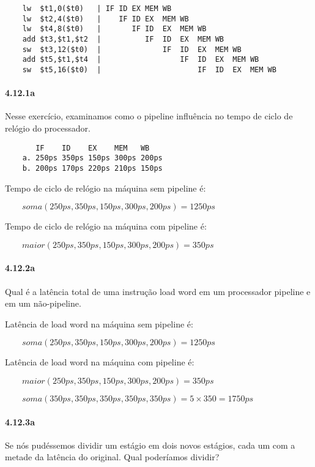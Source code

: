 \documentclass{article}
\begin{document}
\begin{enumerate}
  \begin{verbatim}
    lw  $t1,0($t0)   | IF ID EX MEM WB
    lw  $t2,4($t0)   |    IF ID EX  MEM WB
    lw  $t4,8($t0)   |       IF ID  EX  MEM WB
    add $t3,$t1,$t2  |          IF  ID  EX  MEM WB
    sw  $t3,12($t0)  |              IF  ID  EX  MEM WB
    add $t5,$t1,$t4  |                  IF  ID  EX  MEM WB
    sw  $t5,16($t0)  |                      IF  ID  EX  MEM WB
  \end{verbatim}

\end{enumerate}

\clearpage

\paragraph{4.12.1a} Nesse exercício, examinamos como o pipeline influência no 
tempo de ciclo de relógio do processador.

  \begin{verbatim}
       IF    ID    EX    MEM   WB
    a. 250ps 350ps 150ps 300ps 200ps
    b. 200ps 170ps 220ps 210ps 150ps
  \end{verbatim}

Tempo de ciclo de relógio na máquina sem pipeline é:

$\qquad soma(250ps,350ps,150ps,300ps,200ps) = 1250ps$

Tempo de ciclo de relógio na máquina com pipeline é:

$\qquad maior(250ps, 350ps, 150ps, 300ps, 200ps) = 350ps$

\paragraph{4.12.2a} Qual é a latência total de uma instrução load word em um 
processador pipeline e em um não-pipeline.

Latência de load word na máquina sem pipeline é:

$\qquad soma(250ps,350ps,150ps,300ps,200ps) = 1250ps$

Latência de load word na máquina com pipeline é:

$\qquad maior(250ps, 350ps, 150ps, 300ps, 200ps) = 350ps$

$\qquad soma(350ps,350ps,350ps,350ps,350ps) = 5 \times 350 = 1750ps$

\paragraph{4.12.3a} Se nós pudéssemos dividir um estágio em dois novos 
estágios, cada um com a metade da latência do original. Qual poderíamos dividir?
\end{document}
